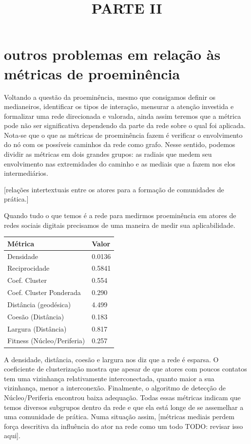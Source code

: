 \documentclass{article}
\begin{document}
\title{PARTE II}

\section{outros problemas em relação às métricas de proeminência}

Voltando a questão da proeminência, mesmo que consigamos definir os medianeiros,
identificar os tipos de interação, mensurar a atenção investida e formalizar uma
rede direcionada e valorada, ainda assim teremos que a métrica pode não ser
significativa dependendo da parte da rede sobre o qual foi aplicada. Nota-se que
o que as métricas de proeminência fazem é verificar o envolvimento do nó com os
possíveis caminhos da rede como grafo. Nesse sentido, podemos dividir as
métricas em dois grandes grupos: as radiais que medem seu envolvimento nas
extremidades do caminho e as mediais que a fazem nos elos intermediários.

[relações intertextuais entre os atores para a formação de comunidades de
prática.]

Quando tudo o que temos é a rede para medirmos proeminência em atores de redes
sociais digitais precisamos de uma maneira de medir sua aplicabilidade.


\begin{tabular}{| l | l |}
\hline
Métrica & Valor \\ \hline
Densidade & 0.0136 \\
Reciprocidade & 0.5841 \\
Coef. Cluster & 0.554 \\
Coef. Cluster Ponderada & 0.290 \\
Distância (geodésica) & 4.499 \\
Coesão (Distância) & 0.183 \\
Largura (Distância) & 0.817 \\
Fitness (Núcleo/Periferia) & 0.257 \\
\hline
\end{tabular}

A densidade, distância, coesão e largura nos diz que a rede é esparsa. O
coeficiente de clusterização mostra que apesar de que atores com poucos contatos
tem uma vizinhança relativamente interconectada, quanto maior a sua vizinhança,
menor a interconexão. Finalmente, o algoritmo de detecção de Núcleo/Periferia
encontrou baixa adequação. Todas essas métricas indicam que temos diversos
subgrupos dentro da rede e que ela está longe de se assemelhar a uma comunidade
de prática. Numa situação assim, [métricas mediais perdem força descritiva da
influência do ator na rede como um todo TODO: revisar isso aqui].
\end{document}
